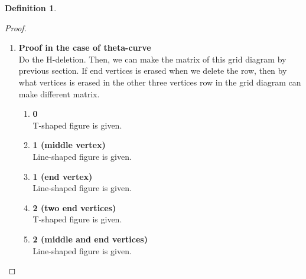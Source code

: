 \documentclass{article}
\theoremstyle{definition}
\newtheorem{defn}[thm]{Definition}
\theoremstyle{theorem}
\theoremstyle{proposition}
\theoremstyle{corollary}
\begin{document}
\begin{defn}
\begin{proof}
\begin{enumerate}
\item \textbf{Proof in the case of theta-curve}\\
Do the H-deletion. Then, we can make the matrix of this grid diagram by previous section. If end vertices is erased when we delete the row, then by what vertices is erased in the other three vertices row in the grid diagram can make different matrix.
\begin{enumerate}
    \item \textbf{0}\\
    T-shaped figure is given.
    \item \textbf{1 (middle vertex)}\\
    Line-shaped figure is given.
    \item \textbf{1 (end vertex)}\\
    Line-shaped figure is given.
    \item \textbf{2 (two end vertices)}\\
    T-shaped figure is given.
    \item \textbf{2 (middle and end vertices)}\\
    Line-shaped figure is given.
\end{enumerate}


\end{enumerate}
\end{proof}
\end{defn}
\end{document}
